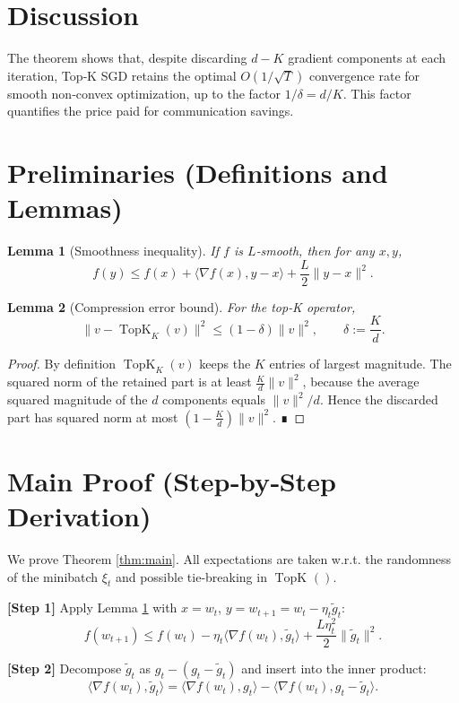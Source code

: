 \documentclass{article}
\newtheorem{lemma}{Lemma}
\newcommand{\TopK}[2]{\operatorname{TopK}_{#1}(#2)} %
\begin{document}
\section*{Discussion}
The theorem shows that, despite discarding $d-K$ gradient components at each iteration, Top‑K SGD retains the optimal $O(1/\sqrt{T})$ convergence rate for smooth non‑convex optimization, up to the factor $1/\delta= d/K$. This factor quantifies the price paid for communication savings.

\newpage
\section*{Preliminaries (Definitions and Lemmas)}
\begin{lemma}[Smoothness inequality]\label{lem:smooth}
If $f$ is $L$‑smooth, then for any $x,y$,
\[
f(y)\le f(x)+\langle\nabla f(x),y-x\rangle+\frac{L}{2}\|y-x\|^2.
\]
\end{lemma}
\begin{lemma}[Compression error bound]\label{lem:compress}
For the top‑K operator,
\[
\|v-\TopK{K}{v}\|^2\le(1-\delta)\|v\|^2,\qquad\delta:=\frac{K}{d}.
\]
\end{lemma}
\begin{proof}
By definition $\TopK{K}{v}$ keeps the $K$ entries of largest magnitude. The squared norm of the retained part is at least $\frac{K}{d}\|v\|^2$, because the average squared magnitude of the $d$ components equals $\|v\|^2/d$. Hence the discarded part has squared norm at most $(1-\frac{K}{d})\|v\|^2$. ∎
\end{proof}

\section*{Main Proof (Step‑by‑Step Derivation)}
We prove Theorem \ref{thm:main}. All expectations are taken w.r.t. the randomness of the minibatch $\xi_t$ and possible tie‑breaking in $\TopK{}{}$.

\noindent\textbf{[Step 1]} Apply Lemma \ref{lem:smooth} with $x=w_t$, $y=w_{t+1}=w_t-\eta_t\tilde g_t$:
\[
f(w_{t+1})\le f(w_t)-\eta_t\langle\nabla f(w_t),\tilde g_t\rangle
+\frac{L\eta_t^{2}}{2}\|\tilde g_t\|^{2}.
\tag{4}
\]

\noindent\textbf{[Step 2]} Decompose $\tilde g_t$ as $g_t-(g_t-\tilde g_t)$ and insert into the inner product:
\[
\langle\nabla f(w_t),\tilde g_t\rangle
= \langle\nabla f(w_t),g_t\rangle
-\langle\nabla f(w_t),g_t-\tilde g_t\rangle.
\tag{5}
\]
\end{document}
